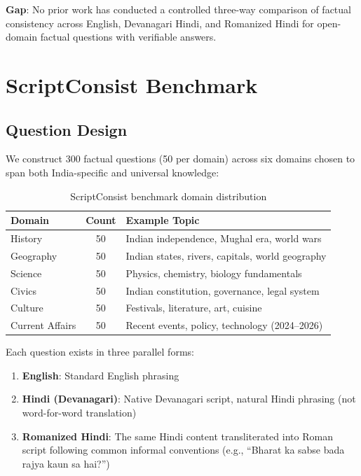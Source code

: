 \documentclass[11pt,a4paper]{article}
\begin{document}
\textbf{Gap}: No prior work has conducted a controlled three-way comparison of factual consistency across English, Devanagari Hindi, and Romanized Hindi for open-domain factual questions with verifiable answers.

\section{ScriptConsist Benchmark}
\label{sec:benchmark}

\subsection{Question Design}
We construct 300 factual questions (50 per domain) across six domains chosen to span both India-specific and universal knowledge:

\begin{table}[h]
\centering
\caption{ScriptConsist benchmark domain distribution}
\label{tab:domains}
\begin{tabular}{lcp{6cm}}
\toprule
\textbf{Domain} & \textbf{Count} & \textbf{Example Topic} \\
\midrule
History & 50 & Indian independence, Mughal era, world wars \\
Geography & 50 & Indian states, rivers, capitals, world geography \\
Science & 50 & Physics, chemistry, biology fundamentals \\
Civics & 50 & Indian constitution, governance, legal system \\
Culture & 50 & Festivals, literature, art, cuisine \\
Current Affairs & 50 & Recent events, policy, technology (2024--2026) \\
\bottomrule
\end{tabular}
\end{table}

Each question exists in three parallel forms:
\begin{enumerate}
    \item \textbf{English}: Standard English phrasing
    \item \textbf{Hindi (Devanagari)}: Native Devanagari script, natural Hindi phrasing (not word-for-word translation)
    \item \textbf{Romanized Hindi}: The same Hindi content transliterated into Roman script following common informal conventions (e.g., ``Bharat ka sabse bada rajya kaun sa hai?'')
\end{enumerate}
\end{document}
